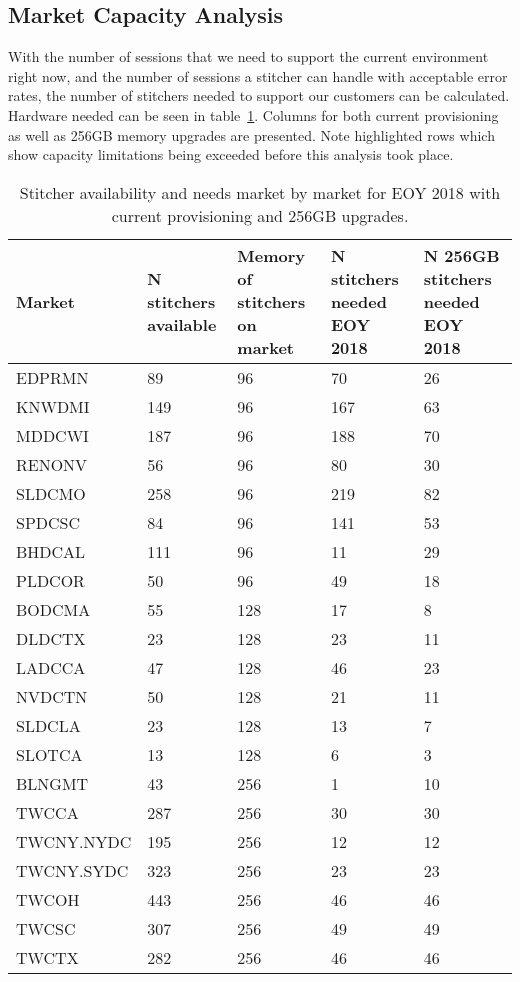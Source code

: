 \documentclass{article}
\begin{document}
\subsection{Market Capacity Analysis}
\label{SECTION-MarketCapacity}

With the number of sessions that we need to support the current environment right now, and the number of sessions a stitcher can handle with acceptable error rates, the number of stitchers needed to support our customers can be calculated. Hardware needed can be seen in table~\ref{TABLE-StitchersNeeded2018}. Columns for both current provisioning as well as 256GB memory upgrades are presented. Note highlighted rows which show capacity limitations being exceeded before this analysis took place. 

\begin{table}
\begin{tabular}{|l|p{17mm}|p{17mm}|p{17mm}|p{17mm}|} 
\hline Market & N stitchers available & Memory of stitchers on market & N stitchers needed EOY 2018 & N 256GB stitchers needed EOY 2018 \\
\hline EDPRMN & 89 & 96 & 70 & 26 \\
\rowcolor{orange}\hline KNWDMI & 149 & 96 & 167 & 63 \\
\rowcolor{orange}\hline MDDCWI & 187 & 96 & 188 & 70 \\
\rowcolor{orange}\hline RENONV & 56 & 96 & 80 & 30 \\
\hline SLDCMO & 258 & 96 & 219 & 82  \\
\rowcolor{orange}\hline SPDCSC & 84 & 96 & 141 & 53 \\
\hline BHDCAL & 111 & 96 & 11 & 29\\
\rowcolor{yellow}\hline PLDCOR & 50 & 96 & 49 & 18 \\
\hline BODCMA & 55 & 128 & 17 & 8  \\
\rowcolor{yellow}\hline DLDCTX & 23 & 128 & 23 & 11 \\
\rowcolor{yellow}\hline LADCCA & 47 & 128 & 46 & 23 \\
\hline NVDCTN & 50 & 128 & 21 & 11  \\
\hline SLDCLA & 23 & 128 & 13 & 7 \\
\hline SLOTCA & 13 & 128 & 6 & 3 \\
\hline BLNGMT & 43 & 256 & 1 & 10\\
\hline TWCCA & 287 & 256 & 30 & 30 \\
\hline TWCNY.NYDC & 195 & 256 & 12 & 12 \\
\hline TWCNY.SYDC & 323 & 256 & 23 & 23 \\
\hline TWCOH & 443 & 256 & 46 & 46 \\
\hline TWCSC & 307 & 256 & 49 & 49 \\
\hline TWCTX & 282 & 256 & 46 & 46 \\
\hline 
\end{tabular}
\caption{\label{TABLE-StitchersNeeded2018}Stitcher availability and needs market by market for EOY 2018 with current provisioning and 256GB upgrades.} 
\end{table}
\end{document}
